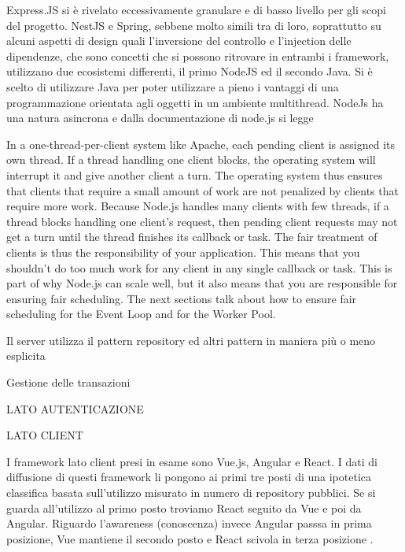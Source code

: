 \documentclass[a4paper,11pt]{article}
\begin{document}
Express.JS si è rivelato eccessivamente granulare e di basso livello per gli scopi del progetto. NestJS e Spring, sebbene molto simili tra di loro, soprattutto su alcuni aspetti di design quali l'inversione del controllo e l'injection delle dipendenze, che sono concetti che si possono ritrovare in entrambi i framework, utilizzano due ecosistemi differenti, il primo NodeJS ed il secondo Java. Si è scelto di utilizzare Java per poter utilizzare a pieno i vantaggi di una programmazione orientata agli oggetti in un ambiente multithread. NodeJs ha una natura asincrona e dalla documentazione di node.js \cite{nodedontblock} si legge

In a one-thread-per-client system like Apache, each pending client is assigned its own thread. If a thread handling one client blocks, the operating system will interrupt it and give another client a turn. The operating system thus ensures that clients that require a small amount of work are not penalized by clients that require more work. Because Node.js handles many clients with few threads, if a thread blocks handling one client's request, then pending client requests may not get a turn until the thread finishes its callback or task. The fair treatment of clients is thus the responsibility of your application. This means that you shouldn't do too much work for any client in any single callback or task. This is part of why Node.js can scale well, but it also means that you are responsible for ensuring fair scheduling. The next sections talk about how to ensure fair scheduling for the Event Loop and for the Worker Pool.


Il server utilizza il pattern repository ed altri pattern in maniera più o meno esplicita

Gestione delle transazioni

LATO AUTENTICAZIONE


LATO CLIENT

I framework lato client presi in esame sono Vue.js, Angular e React.
I dati di diffusione di questi framework li pongono ai primi tre posti di una ipotetica classifica basata sull'utilizzo misurato in numero di repository pubblici. Se si guarda all'utilizzo al primo posto troviamo React seguito da Vue e poi da Angular. Riguardo l'awareness (conoscenza) invece Angular passsa in prima posizione, Vue mantiene il secondo posto e React scivola in terza posizione \cite{stateofjsStateJavaScript}.
\end{document}
